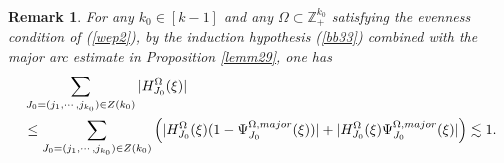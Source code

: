 \documentclass[10pt,a4paper]{amsart}
\newtheorem{remark}{Remark}\numberwithin{remark}{section}
\numberwithin{equation}{section}
\begin{document}
\begin{remark}\label{yu1}
 For any $ k_0\in  [k-1]$ and any $\Omega\subset \mathbb{Z}_+^{k_0}$  satisfying the evenness condition of (\ref{wep2}),	by the induction hypothesis (\ref{bb33}) combined with    the  major arc estimate in Proposition \ref{lemm29}, one has
	\begin{align*} 
		&\sum_{J_0=(j_1,\cdots,j_{k_0})\in  Z(k_0)} |H^{\Omega}_{J_0}(\xi)|\\
		&\le\sum_{J_0=(j_1,\cdots,j_{k_0})\in  Z(k_0)} \left(|H^{\Omega}_{J_0}(\xi)(1-\Psi^{\Omega,\rm{major}}_{J_0}(\xi))|+ |H^{\Omega}_{J_0}(\xi) \Psi^{\Omega,\rm{major}}_{J_0}(\xi)|\right) \lesssim 1. 
	\end{align*}

\end{remark}
\end{document}
